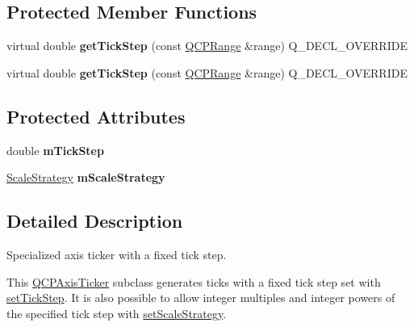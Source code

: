 \subsection*{Protected Member Functions}
\begin{DoxyCompactItemize}
\item 
virtual double {\bfseries get\+Tick\+Step} (const \hyperlink{class_q_c_p_range}{Q\+C\+P\+Range} \&range) Q\+\_\+\+D\+E\+C\+L\+\_\+\+O\+V\+E\+R\+R\+I\+DE\hypertarget{class_q_c_p_axis_ticker_fixed_a9e99da01ab92a86aed415eef32fed13a}{}\label{class_q_c_p_axis_ticker_fixed_a9e99da01ab92a86aed415eef32fed13a}

\item 
virtual double {\bfseries get\+Tick\+Step} (const \hyperlink{class_q_c_p_range}{Q\+C\+P\+Range} \&range) Q\+\_\+\+D\+E\+C\+L\+\_\+\+O\+V\+E\+R\+R\+I\+DE\hypertarget{class_q_c_p_axis_ticker_fixed_ada7d04195eafb15398dbfa1ed163e64f}{}\label{class_q_c_p_axis_ticker_fixed_ada7d04195eafb15398dbfa1ed163e64f}

\end{DoxyCompactItemize}
\subsection*{Protected Attributes}
\begin{DoxyCompactItemize}
\item 
double {\bfseries m\+Tick\+Step}\hypertarget{class_q_c_p_axis_ticker_fixed_a4aeef2d3eaa57ec56f422ab1f82175d2}{}\label{class_q_c_p_axis_ticker_fixed_a4aeef2d3eaa57ec56f422ab1f82175d2}

\item 
\hyperlink{class_q_c_p_axis_ticker_fixed_a15b3d38b935d404b1311eb85cfb6a439}{Scale\+Strategy} {\bfseries m\+Scale\+Strategy}\hypertarget{class_q_c_p_axis_ticker_fixed_a61ead1590161769b0d36e09419e67b10}{}\label{class_q_c_p_axis_ticker_fixed_a61ead1590161769b0d36e09419e67b10}

\end{DoxyCompactItemize}


\subsection{Detailed Description}
Specialized axis ticker with a fixed tick step. 



This \hyperlink{class_q_c_p_axis_ticker}{Q\+C\+P\+Axis\+Ticker} subclass generates ticks with a fixed tick step set with \hyperlink{class_q_c_p_axis_ticker_fixed_a4bc83d85a4f81d4abdd3fa5042d7b833}{set\+Tick\+Step}. It is also possible to allow integer multiples and integer powers of the specified tick step with \hyperlink{class_q_c_p_axis_ticker_fixed_acbc7c9bcd80b3dc3edee5f0519d301f6}{set\+Scale\+Strategy}.

